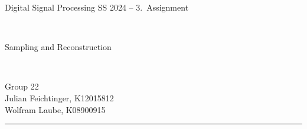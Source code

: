 \documentclass[12pt,a4paper,austrian]{article}
\begin{document}
\pagestyle{plain}


\thispagestyle{empty}
\noindent
\begin{minipage}[b][4cm]{1.0\textwidth}  
\begin{center}
\begin{bf} 
\begin{large} Digital Signal Processing SS 2024 -- 3.~Assignment\end{large} \\
\vspace{0.3cm}
\begin{Large} Sampling and Reconstruction \end{Large} \\
\vspace{0.3cm}
\end{bf}
\begin{large}
Group 22\\
Julian Feichtinger, K12015812\\
Wolfram Laube, K08900915\\
\end{large} 
\end{center}
\end{minipage}

\noindent \rule[0.8em]{\textwidth}{0.12mm}\\[-0.5em]
\end{document}
